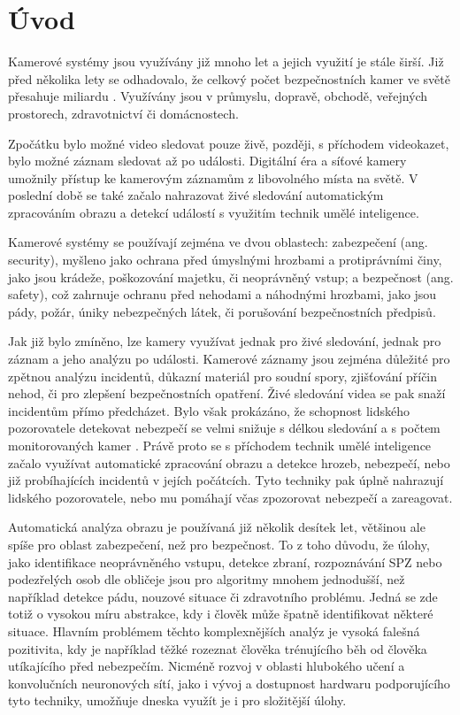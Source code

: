 \chapter{Úvod}
\label{chap:Introduction}

Kamerové systémy jsou využívány již mnoho let a jejich využití je stále širší.
Již před několika lety se odhadovalo, že celkový počet bezpečnostních kamer ve
světě přesahuje miliardu \cite{surveillance}. Využívány jsou v průmyslu,
dopravě, obchodě, veřejných prostorech, zdravotnictví či domácnostech.

Zpočátku bylo možné video sledovat pouze živě, později, s příchodem videokazet,
bylo možné záznam sledovat až po události. Digitální éra a síťové kamery
umožnily přístup ke kamerovým záznamům z libovolného místa na světě. V poslední
době se také začalo nahrazovat živé sledování automatickým zpracováním obrazu a
detekcí událostí s využitím technik umělé inteligence.

Kamerové systémy se používají zejména ve dvou oblastech: zabezpečení (ang.
security), myšleno jako ochrana před úmyslnými hrozbami a protiprávními činy,
jako jsou krádeže, poškozování majetku, či neoprávněný vstup; a bezpečnost
(ang. safety), což zahrnuje ochranu před nehodami a náhodnými hrozbami, jako
jsou pády, požár, úniky nebezpečných látek, či porušování bezpečnostních
předpisů.

Jak již bylo zmíněno, lze kamery využívat jednak pro živé sledování, jednak pro
záznam a jeho analýzu po události. Kamerové záznamy jsou zejména důležité pro
zpětnou analýzu incidentů, důkazní materiál pro soudní spory, zjišťování příčin
nehod, či pro zlepšení bezpečnostních opatření. Živé sledování videa se pak
snaží incidentům přímo předcházet. Bylo však prokázáno, že schopnost lidského
pozorovatele detekovat nebezpečí se velmi snižuje s délkou sledování a s počtem
monitorovaných kamer \cite{soton371614}. Právě proto se s příchodem technik
umělé inteligence začalo využívat automatické zpracování obrazu a detekce
hrozeb, nebezpečí, nebo již probíhajících incidentů v jejích počátcích. Tyto
techniky pak úplně nahrazují lidského pozorovatele, nebo mu pomáhají včas
zpozorovat nebezpečí a zareagovat.

Automatická analýza obrazu je používaná již několik desítek let, většinou ale
spíše pro oblast zabezpečení, než pro bezpečnost. To z toho důvodu, že úlohy,
jako identifikace neoprávněného vstupu, detekce zbraní, rozpoznávání SPZ nebo
podezřelých osob dle obličeje jsou pro algoritmy mnohem jednodušší, než
například detekce pádu, nouzové situace či zdravotního problému. Jedná se zde
totiž o vysokou míru abstrakce, kdy i člověk může špatně identifikovat některé
situace. Hlavním problémem těchto komplexnějších analýz je vysoká falešná
pozitivita, kdy je například těžké rozeznat člověka trénujícího běh od člověka
utíkajícího před nebezpečím. Nicméně rozvoj v oblasti hlubokého učení a
konvolučních neuronových sítí, jako i vývoj a dostupnost hardwaru podporujícího
tyto techniky, umožňuje dneska využít je i pro složitější úlohy.


